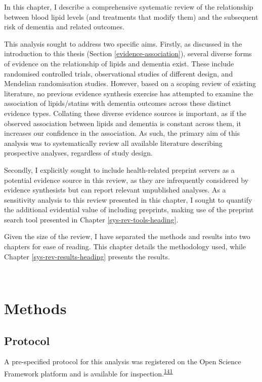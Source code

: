 \documentclass[a4paper, twoside]{templates/ociamthesis}
\begin{document}
In this chapter, I describe a comprehensive systematic review of the relationship between blood lipid levels (and treatments that modify them) and the subsequent risk of dementia and related outcomes.

This analysis sought to address two specific aims. Firstly, as discussed in the introduction to this thesis (Section \ref{evidence-association}), several diverse forms of evidence on the relationship of lipids and dementia exist. These include randomised controlled trials, observational studies of different design, and Mendelian randomisation studies. However, based on a scoping review of existing literature, no previous evidence synthesis exercise has attempted to examine the association of lipids/statins with dementia outcomes across these distinct evidence types. Collating these diverse evidence sources is important, as if the observed association between lipids and dementia is constant across them, it increases our confidence in the association. As such, the primary aim of this analysis was to systematically review all available literature describing prospective analyses, regardless of study design.

Secondly, I explicitly sought to include health-related preprint servers as a potential evidence source in this review, as they are infrequently considered by evidence synthesists but can report relevant unpublished analyses. As a sensitivity analysis to this review presented in this chapter, I sought to quantify the additional evidential value of including preprints, making use of the preprint search tool presented in Chapter \ref{sys-rev-tools-heading}.

Given the size of the review, I have separated the methods and results into two chapters for ease of reading. This chapter details the methodology used, while Chapter \ref{sys-rev-results-heading} presents the results.

~

\hypertarget{methods}{%
\section{Methods}\label{methods}}

\hypertarget{protocol}{%
\subsection{Protocol}\label{protocol}}

A pre-specified protocol for this analysis was registered on the Open Science Framework platform and is available for inspection.\textsuperscript{\protect\hyperlink{ref-mcguinnessluke2020}{141}}
\end{document}
